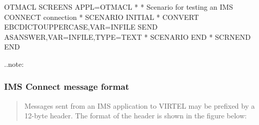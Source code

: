 \documentclass[letterpaper,10pt,english]{sphinxmanual}
\begin{document}
\begin{sphinxVerbatim}[commandchars=\\\{\}]
OTMACL SCREENS APPL=OTMACL
*
* Scenario for testing an IMS CONNECT connection
*
SCENARIO INITIAL
*
CONVERT\PYGZdl{} EBCDIC\PYGZhy{}TO\PYGZhy{}UPPERCASE,VAR=\PYGZsq{}\PYGZdl{}INFILE\PYGZdl{}\PYGZsq{}
SEND\PYGZdl{} AS\PYGZhy{}ANSWER,VAR=\PYGZsq{}\PYGZdl{}INFILE\PYGZdl{}\PYGZsq{},TYPE=\PYGZsq{}TEXT\PYGZsq{}
*
SCENARIO END
*
SCRNEND
END
\end{sphinxVerbatim}


..note:

\begin{sphinxVerbatim}[commandchars=\\\{\}]
           
\end{sphinxVerbatim}


\subsubsection{IMS Connect message format}
\label{\detokenize{connectivity_guide:ims-connect-message-format}}\begin{quote}

Messages sent from an IMS application to VIRTEL may be prefixed by a 12-byte header. The format of the header is shown in the figure below:
\end{quote}
\end{document}
